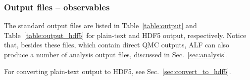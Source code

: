 

\subsubsection{Output files -- observables} \label{sec:output_obs}
%
The standard output files are listed in Table~\ref{table:output} and Table~\ref{table:output_hdf5} for plain-text and HDF5 output, respectively. Notice that, besides these files, which contain direct QMC outputs, ALF can also produce a number of analysis output files, discussed in Sec.~\ref{sec:analysis}.

For converting plain-text output to HDF5, see Sec.~\ref{sec:convert_to_hdf5}.

